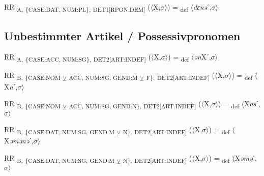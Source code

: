 {\begin{exe}
 RR \textsubscript{A,} \textsubscript{\{CASE:DAT, NUM:PL\},} \textsubscript{DET1[RPON.DEM]} ($\langle$X,$\sigma $$\rangle$) = \textsubscript{def} $\langle$\textit{dɛnə}ˊ,$\sigma $$\rangle$
\end{exe}

\subsection{Unbestimmter Artikel / Possessivpronomen}

\begin{exe}
 RR \textsubscript{A,} \textsubscript{\{CASE:ACC, NUM:SG\},} \textsubscript{DET2[ART:INDEF]} ($\langle$X,$\sigma $$\rangle$) = \textsubscript{def} $\langle$\textit{ən}Xˊ,$\sigma $$\rangle$
\end{exe}

\begin{exe}
 RR \textsubscript{B,} \textsubscript{\{CASE:NOM} \textsubscript{${\veebar}$}\textsubscript{ ACC, NUM:SG, GEND:M} \textsubscript{${\veebar}$}\textsubscript{ F\},} \textsubscript{DET2[ART:INDEF]} ($\langle$X,$\sigma $$\rangle$) = \textsubscript{def} $\langle$X\textit{a}ˊ,$\sigma $$\rangle$
\end{exe}

\begin{exe}
 RR \textsubscript{B,} \textsubscript{\{CASE:NOM} \textsubscript{${\veebar}$}\textsubscript{ ACC, NUM:SG, GEND:N\},} \textsubscript{DET2[ART:INDEF]} ($\langle$X,$\sigma $$\rangle$) = \textsubscript{def} $\langle$X\textit{as}ˊ,$\sigma $$\rangle$
\end{exe}

\begin{exe}
 RR \textsubscript{B,} \textsubscript{\{CASE:DAT, NUM:SG, GEND:M} \textsubscript{${\veebar}$}\textsubscript{ N\},} \textsubscript{DET2[ART:INDEF]} ($\langle$X,$\sigma $$\rangle$) = \textsubscript{def} $\langle$X\textit{əmənə}ˊ,$\sigma $$\rangle$
\end{exe}

\begin{exe}
 RR \textsubscript{B,} \textsubscript{\{CASE:DAT, NUM:SG, GEND:M} \textsubscript{${\veebar}$}\textsubscript{ N\},} \textsubscript{DET2[ART:INDEF]} ($\langle$X,$\sigma $$\rangle$) = \textsubscript{def} $\langle$X\textit{əmə}ˊ,$\sigma $$\rangle$
\end{exe}

}
